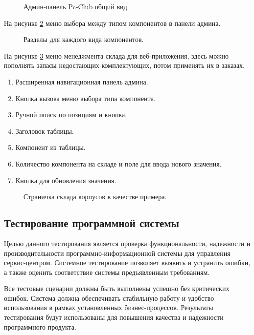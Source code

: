 \begin{figure}[ht]
\caption{Админ-панель Pc-Club общий вид}
\label{adminall:image}
\end{figure}

На рисунке \ref{razdeli:image} меню выбора между типом компонентов в панели админа.

\begin{figure}[htbp]
\caption{Разделы для каждого вида компонентов.}
\label{razdeli:image}
\end{figure}

На рисунке \ref{storedf:image} меню менеджмента склада для веб-приложения, здесь можно пополнять запасы недостающих комплектующих, потом применять их в заказах.

\begin{enumerate}
	\item Расширенная навигационная панель админа.
	\item Кнопка вызова меню выбора типа компонента.
	\item Ручной поиск по позициям и кнопка.
	\item Заголовок таблицы.
	\item Компонент из таблицы.
	\item Количество компонента на складе и поле для ввода нового значения.
	\item Кнопка для обновления значения.
\end{enumerate}

\begin{figure}[ht]
	\caption{Страничка склада корпусов в качестве примера.}
	\label{storedf:image}
\end{figure}
\clearpage

\subsection{Тестирование программной системы}
Целью данного тестирования является проверка функциональности, надежности и производительности программно-информационной системы для управления сервис-центром.
Системное тестирование позволяет выявить и устранить ошибки, а также оценить соответствие системы предъявленным требованиям.

Все тестовые сценарии должны быть выполнены успешно без критических ошибок. Система должна обеспечивать стабильную работу и удобство использования в рамках установленных бизнес-процессов. Результаты тестирования будут использованы для повышения качества и надежности программного продукта.

